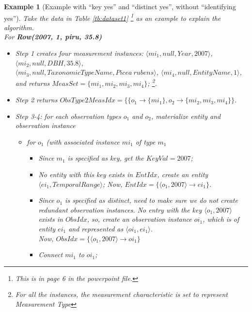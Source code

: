 \documentclass[10pt]{article}
\newtheorem{example}{Example}[section]
\begin{document}
\begin{example} [Example with ``key yes'' and ``distinct yes'', without ``identifying yes'']
Take the data in Table \ref{tb:dataset1} \footnote{This is in page 6 in the powerpoint file.}
as an example to explain the algorithm. \\
For {\bf Row(2007, 1, piru, 35.8)}
\begin{itemize}
\item Step 1 creates four measurement instances: 
$\langle mi_1, null, Year, 2007\rangle$, $\langle mi_2, null, DBH, 35.8\rangle$, \\
$\langle mi_3, null, TaxonomicTypeName, Picea~rubens\rangle$, $\langle mi_4, null, EntityName, 1\rangle$,\\
and returns $MeasSet = \{mi_1, mi_2, mi_3, mi_4\}$;
\footnote{For all the instances, the measurement characteristic is set to represent Measurement Type}.

\item Step 2 returns $ObsType2MeasIdx = \{\{o_1\rightarrow \{mi_1\}, o_2 \rightarrow \{mi_2, mi_3, mi_4\}\}$. 
 \item Step 3-4: for each observation types $o_1$ and $o_2$,  materialize entity and observation instance
    \begin{itemize}
    \item for $o_1$ (with associated instance $mi_1$ of type $m_1$
    \begin{itemize}
        \item Since $m_1$ is specified as key, get the $KeyVal=2007$;
        \item No entity with this key exists in $EntIdx$, create an entity $\langle ei_1, TemporalRange\rangle$; Now, $EntIdx=\{\langle o_1, 2007\rangle\rightarrow ei_1\}$.
        \item Since $o_1$ is specified as {\em distinct}, need to make sure we do not create redundant observation instances. No entry with the key $\langle o_1, 2007\rangle$ exists in $ObsIdx$, so, create an observation instance $oi_1$, which is of entity $ei_1$ and represented as $\langle oi_1, ei_1\rangle$. \\
	Now, $ObsIdx=\{\langle o_1, 2007 \rangle \rightarrow oi_1\}$
        \item Connect $mi_1$ to $oi_1$;
    \end{itemize}
    

\end{itemize}
\end{itemize}
\end{example}
\end{document}
